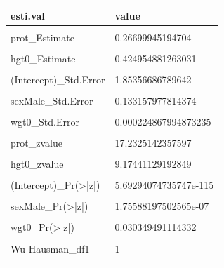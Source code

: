 \documentclass[
]{book}
\begin{document}
\begin{table}[!h]
\centering
\begin{tabular}{l|l}
\hline
esti.val & value\\
\hline
\cellcolor{gray!6}{(Intercept)\_Estimate} & \cellcolor{gray!6}{42.2437613555242}\\
\hline
prot\_Estimate & 0.26699945194704\\
\hline
\cellcolor{gray!6}{sexMale\_Estimate} & \cellcolor{gray!6}{0.695548488812932}\\
\hline
hgt0\_Estimate & 0.424954881263031\\
\hline
\cellcolor{gray!6}{wgt0\_Estimate} & \cellcolor{gray!6}{0.000486951420329484}\\
\hline
(Intercept)\_Std.Error & 1.85356686789642\\
\hline
\cellcolor{gray!6}{prot\_Std.Error} & \cellcolor{gray!6}{0.0154939347964083}\\
\hline
sexMale\_Std.Error & 0.133157977814374\\
\hline
\cellcolor{gray!6}{hgt0\_Std.Error} & \cellcolor{gray!6}{0.0463195803786233}\\
\hline
wgt0\_Std.Error & 0.000224867994873235\\
\hline
\cellcolor{gray!6}{(Intercept)\_zvalue} & \cellcolor{gray!6}{22.7905246296649}\\
\hline
prot\_zvalue & 17.2325142357597\\
\hline
\cellcolor{gray!6}{sexMale\_zvalue} & \cellcolor{gray!6}{5.22348341593581}\\
\hline
hgt0\_zvalue & 9.17441129192849\\
\hline
\cellcolor{gray!6}{wgt0\_zvalue} & \cellcolor{gray!6}{2.16549901022595}\\
\hline
(Intercept)\_Pr(>|z|) & 5.69294074735747e-115\\
\hline
\cellcolor{gray!6}{prot\_Pr(>|z|)} & \cellcolor{gray!6}{1.51424021931607e-66}\\
\hline
sexMale\_Pr(>|z|) & 1.75588197502565e-07\\
\hline
\cellcolor{gray!6}{hgt0\_Pr(>|z|)} & \cellcolor{gray!6}{4.54048595587756e-20}\\
\hline
wgt0\_Pr(>|z|) & 0.030349491114332\\
\hline
\cellcolor{gray!6}{Weakinstruments\_df1} & \cellcolor{gray!6}{4}\\
\hline
Wu-Hausman\_df1 & 1\\
\hline
\cellcolor{gray!6}{Sargan\_df1} & \cellcolor{gray!6}{3}\\

\end{tabular}
\end{table}
\end{document}
